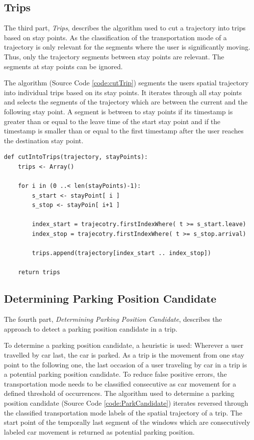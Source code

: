 \subsection{Trips}
The third part, \textit{Trips}, describes the algorithm used to cut a trajectory into trips based on stay points. As the classification of the transportation mode of a trajectory is only relevant for the segments where the user is significantly moving. Thus, only the trajectory segments between stay points are relevant. The segments at stay points can be ignored.

The algorithm (Source Code \ref{code:cutTrip}) segments the users spatial trajectory into individual trips based on its stay points. It iterates through all stay points and selects the segments of the trajectory which are between the current and the following stay point. A segment is between to stay points if its timestamp is greater than or equal to the leave time of the start stay point and if the timestamp is smaller than or equal to the first timestamp after the user reaches the destination stay point. 

\begin{lstlisting}[style=py, caption={Pseudocode: Determine Trips in a Trajectory}, label={code:cutTrip}]
def cutIntoTrips(trajectory, stayPoints):
    trips <- Array()
    
    for i in (0 ..< len(stayPoints)-1):
        s_start <- stayPoint[ i ]
        s_stop <- stayPoin[ i+1 ]
        
        index_start = trajecotry.firstIndexWhere( t >= s_start.leave)
        index_stop = trajecotry.firstIndexWhere( t >= s_stop.arrival)
        
        trips.append(trajectory[index_start .. index_stop])
    
    return trips
\end{lstlisting}


\subsection{Determining Parking Position Candidate}
The fourth part, \textit{Determining Parking Position Candidate}, describes the approach to detect a parking position candidate in a trip. 

To determine a parking position candidate, a heuristic is used: Wherever a user travelled by car last, the car is parked. As a trip is the movement from one stay point to the following one, the last occasion of a user traveling by car in a trip is a potential parking position candidate. To reduce false positive errors, the transportation mode needs to be classified consecutive as car movement for a defined threshold of occurrences. The algorithm used to determine a parking position candidate (Source Code \ref{code:ParkCandidate}) iterates reversed through the classified transportation mode labels of the spatial trajectory of a trip. The start point of the temporally last segment of the windows which are consecutively labeled car movement is returned as potential parking position. 

